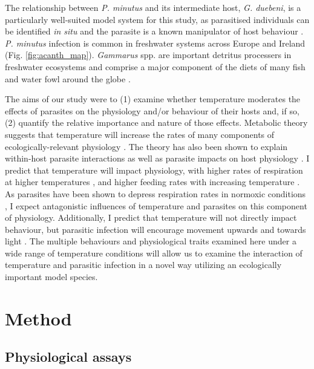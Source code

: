 The relationship between \emph{P. minutus} and its intermediate host, \emph{G. duebeni}, is a particularly well-suited model system for this study, as parasitised individuals can be identified \emph{in situ} and the parasite is a known manipulator of host behaviour \citep{moore1996, fielding2003, benesh2005, perrot2007, jacquin2014}. \emph{P. minutus} infection is common in freshwater systems across Europe \citep{medoc2006} and Ireland (Fig. \ref{fig:acanth_map}). \emph{Gammarus} spp. are important detritus processers in freshwater ecosystems \citep{macneil1997, sutcliffe2000} and comprise a major component of the diets of many fish and water fowl around the globe \citep{mortensen1982, byers2010}.

The aims of our study were to (1) examine whether temperature moderates the effects of parasites on the physiology and/or behaviour of their hosts and, if so, (2) quantify the relative importance and nature of those effects. Metabolic theory suggests that temperature will increase the rates of many components of ecologically-relevant physiology \citep{brown2004, kordas2011}. The theory has also been shown to explain within-host parasite interactions as well as parasite impacts on host physiology \citep{kirk2018}. I predict that temperature will impact physiology, with higher rates of respiration at higher temperatures \citep{halcrow1967, bulnheim1979}, and higher feeding rates with increasing temperature \citep{nilsson1974}. As parasites have been shown to depress respiration rates in normoxic conditions \citep{perrot2016}, I expect antagonistic influences of temperature and parasites on this component of physiology. Additionally, I predict that temperature will not directly impact behaviour, but parasitic infection will encourage movement upwards and towards light \citep{labaude2017}. The multiple behaviours and physiological traits examined here under a wide range of temperature conditions will allow us to examine the interaction of temperature and parasitic infection in a novel way utilizing an ecologically important model species. 

\section{Method}

\subsection{Physiological assays}

